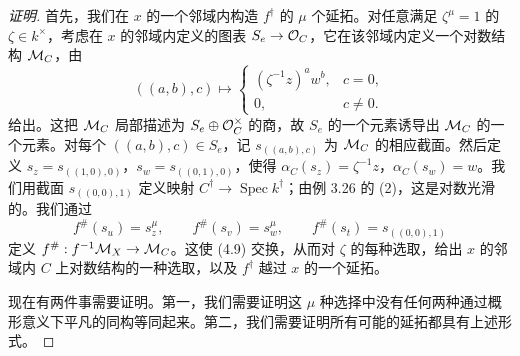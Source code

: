 \begin{proof}[证明]
首先，我们在 $x$ 的一个邻域内构造 $f^\dagger$ 的 $\mu$ 个延拓。对任意满足 $\zeta^\mu=1$ 的 $\zeta\in k^\times$，考虑在 $x$ 的邻域内定义的图表 $S_e\to\mathcal{O}_C$，它在该邻域内定义一个对数结构 $\mathcal{M}_C$，由
\begin{equation}
((a,b),c)\mapsto\begin{cases}(\zeta^{-1}z)^aw^b,&c=0,\\ 0,&c\ne0.\end{cases}
\tag{4.10}
\end{equation}
给出。这把 $\mathcal{M}_C$ 局部描述为 $S_e\oplus\mathcal{O}_C^\times$ 的商，故 $S_e$ 的一个元素诱导出 $\mathcal{M}_C$ 的一个元素。对每个 $((a,b),c)\in S_e$，记 $s_{((a,b),c)}$ 为 $\mathcal{M}_C$ 的相应截面。然后定义 $s_z=s_{((1,0),0)}$，$s_w=s_{((0,1),0)}$，使得 $\alpha_C(s_z)=\zeta^{-1}z$，$\alpha_C(s_w)=w$。我们用截面 $s_{((0,0),1)}$ 定义映射 $C^\dagger\to\operatorname{Spec}k^\dagger$；由例 3.26 的 (2)，这是对数光滑的。我们通过
\begin{equation}
f^\#(s_u)=s_z^\mu,\qquad f^\#(s_v)=s_w^\mu,\qquad f^\#(s_t)=s_{((0,0),1)}
\tag{4.11}
\end{equation}
定义 $f^\#:f^{-1}\mathcal{M}_X\to\mathcal{M}_C$。这使 (4.9) 交换，从而对 $\zeta$ 的每种选取，给出 $x$ 的邻域内 $C$ 上对数结构的一种选取，以及 $f^\dagger$ 越过 $x$ 的一个延拓。


现在有两件事需要证明。第一，我们需要证明这 $\mu$ 种选择中没有任何两种通过概形意义下平凡的同构等同起来。第二，我们需要证明所有可能的延拓都具有上述形式。


\end{proof}
